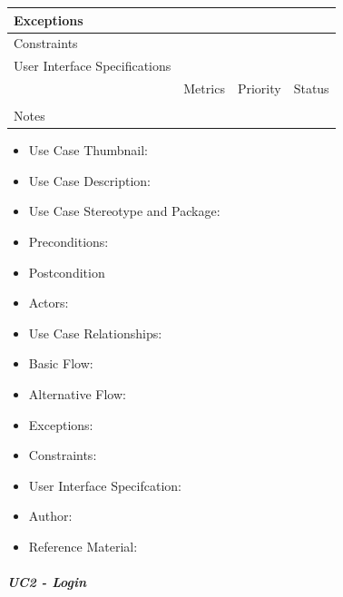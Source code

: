 \begin{table}[H]
\begin{tabularx}{\linewidth}{|l|X|X|X|}
            \hline Exceptions                    & \multicolumn{3}{l|}{}                                                                                 \\

            \hline Constraints                   & \multicolumn{3}{l|}{}                                                                                 \\

            \hline User Interface Specifications & \multicolumn{3}{l|}{}                                                                                 \\

            \hline \multirow{2}{*}{}             & Metrics                                                                           & Priority & Status \\
            \cline{2-4}                          &                                                                                   &          &        \\
            \hline Notes                         & \multicolumn{3}{l|}{}                                                                                 \\
            \hline
      \end{tabularx}

\end{table}
\begin{itemize}
      \item[] Use Case Thumbnail:
      \item[] Use Case Description:
      \item[] Use Case Stereotype and Package:
      \item[] Preconditions:
      \item[] Postcondition
      \item[] Actors:
      \item[] Use Case Relationships:
      \item[] Basic Flow:
      \item[] Alternative Flow:
      \item[] Exceptions:
      \item[] Constraints:
      \item[] User Interface Specifcation:
      \item[] Author:
      \item[] Reference Material:
\end{itemize}
\subparagraph{UC2 - Login}
